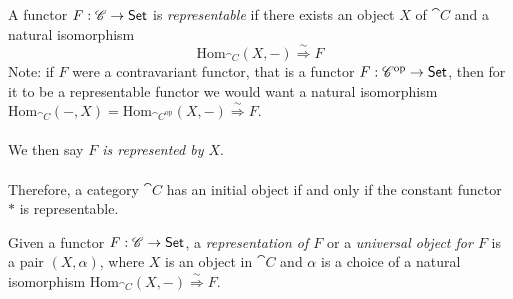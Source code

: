 \vspace*{0.1in}

\begin{definition}\label{repfunc}
A functor $F:\mathscr{C} \to \mathsf{Set}$ is \emph{representable} if there exists an object $X$ of $\cat{C}$ and a natural isomorphism
\[\mathrm{Hom}_{\cat{C}}(X,-) \overset{\sim}{\Longrightarrow} F\]
Note: if $F$ were a contravariant functor, that is a functor $F:\mathscr{C}^{\text{op}} \to \mathsf{Set}$, then for it to be a representable functor we would want a natural isomorphism $\mathrm{Hom}_{\cat{C}}(-,X) = \mathrm{Hom}_{\cat{C}^{\text{op}}}(X,-) \overset{\sim}{\Longrightarrow} F$.\\
\\
We then say \emph{$F$ is represented by $X$}.\\
\\
Therefore, a category $\cat{C}$ has an initial object if and only if the constant functor $*$ is representable.
\end{definition}

\vspace{0.1in}

\begin{definition}\label{repfuncat1}
Given a functor $F:\mathscr{C} \to \mathsf{Set}$, a \emph{representation of $F$} or a \emph{universal object for $F$} is a pair $(X,\alpha)$, where $X$ is an object in $\cat{C}$ and $\alpha$ is a choice of a natural isomorphism $\mathrm{Hom}_{\cat{C}}(X,-) \overset{\sim}{\Longrightarrow} F$.
\end{definition}

\vspace{0.1in}

